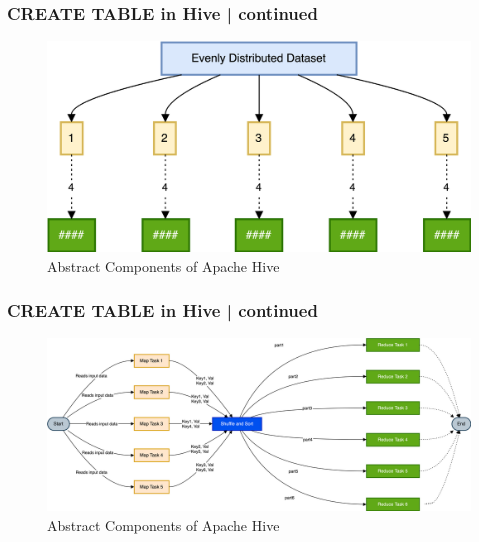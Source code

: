		\begin{frame}
			\frametitle{CREATE TABLE in Hive | continued}  
			\vspace{-0.5cm}		
			\begin{tcolorbox}[colback=white,colframe=black,title= Part 7: Data Skewing]	
				\begin{figure}
					\includegraphics[width=\textwidth,height=.6\textheight,keepaspectratio]{./Figures/chapter-03/dwh_hive-unskweed_dt.png}	
					\caption{Abstract Components of Apache Hive}
				\end{figure}
			\end{tcolorbox}
		\end{frame}
		\begin{frame}
			\frametitle{CREATE TABLE in Hive | continued}  
			\vspace{-0.5cm}		
			\begin{tcolorbox}[colback=white,colframe=black,title= Part 7: Data Skewing]	
				\begin{figure}
					\includegraphics[width=\textwidth,height=.7\textheight,keepaspectratio]{./Figures/chapter-03/dwh_hive-unskweed_dt_mr.png}	
					\caption{Abstract Components of Apache Hive}
				\end{figure}
			\end{tcolorbox}
		\end{frame}	
		
